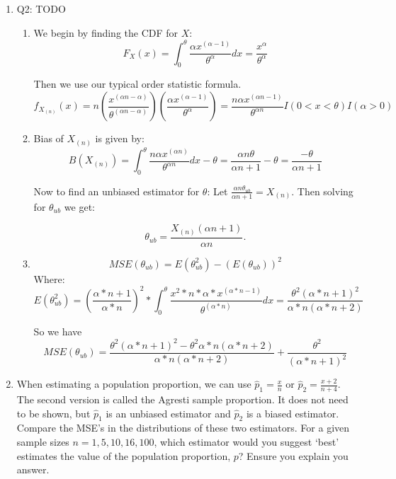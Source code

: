 \documentclass{article}
\begin{document}
\begin{enumerate}
 \item Q2: TODO 
     \begin{enumerate}[label= (\alph*)] 
         \item 

             We begin by finding the CDF for $X$:
             $$F_{X}(x) = \int_{0}^{\theta} \frac{\alpha x^{(\alpha - 1)}}{\theta^{\alpha}}dx = \frac{x^{\alpha}}{\theta^{\alpha}}$$

             Then we use our typical order statistic formula.
    $$f_{X_{(n)}}(x) = n\left(\frac{x^{(\alpha n - \alpha)}}{\theta^{(\alpha n - \alpha)}}\right)\left(\frac{\alpha x^{(\alpha-1)}}{\theta^{\alpha}}\right) = \frac{n\alpha x^{(\alpha n-1)}}{\theta^{\alpha n}} I(0 < x < \theta)I(\alpha > 0)$$

\item 
    Bias of $X_{(n)}$ is given by:
    $$B(X_{(n)}) = \int_{0}^{\theta} \frac{n \alpha x^{(\alpha n)}}{\theta^{\alpha n}}dx - \theta = \frac{\alpha n \theta}{\alpha n+1} - \theta = \frac{-\theta}{\alpha n+1}$$


 Now to find an unbiased estimator for $\theta$: Let $\frac{\alpha n \theta_{ub}}{\alpha n+1} = X_{(n)}$. 
    Then solving for $\theta_{ub}$ we get:

    $$\theta_{ub} = \frac{X_{(n)} (\alpha n+1)}{\alpha n}.$$
\item
        $$MSE(\theta_{ub}) = E(\theta_{ub}^2) - (E(\theta_{ub}))^2$$
Where: 
$$E(\theta_{ub}^2) = (\frac{\alpha*n+1}{\alpha*n})^2*\int_{0}^{\theta} \frac{x^2*n*\alpha*x^{(\alpha*n-1)}}{\theta^{(\alpha*n)}}dx = \frac{\theta^2(\alpha*n+1)^2}{\alpha*n(\alpha*n+2)}$$

So we have 
$$MSE(\theta_{ub}) = \frac{\theta^2(\alpha*n+1)^2-\theta^2\alpha*n(\alpha*n+2)}{\alpha*n(\alpha*n+2)} + \frac{\theta^2}{(\alpha*n+1)^2}$$
     \end{enumerate}
\item When estimating a population proportion, we can use $\hat{p}_1=\frac{x}{n}$ or 
$\hat{p}_2 = \frac{x+2}{n+4}$. The second version is
called the Agresti sample proportion. It does not need to be shown, but $\hat{p}_1$ is an unbiased estimator
and $\hat{p}_2$ is a biased estimator. Compare the MSE’s in the distributions of these two estimators. For a
given sample sizes $n = 1, 5, 10, 16, 100$, which estimator would you suggest ‘best’ estimates the value
of the population proportion, $p$? Ensure you explain you answer.


\end{enumerate}
\end{document}
